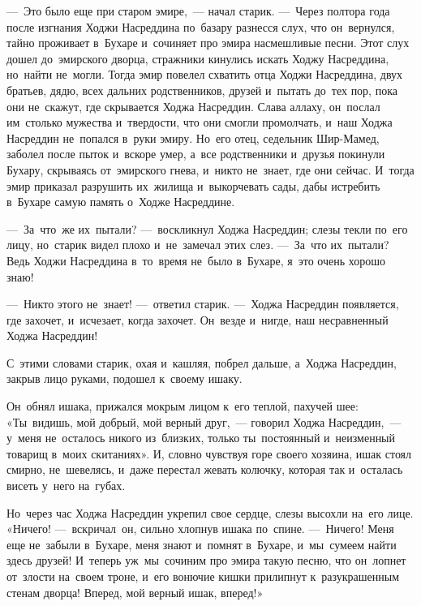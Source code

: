 \documentclass[12pt,a4paper]{book}
\begin{document}
—~Это было еще при старом эмире,~— начал старик. —~Через полтора года после изгнания Ходжи Насреддина по~базару разнесся слух, что он~вернулся, тайно проживает в~Бухаре и~сочиняет про эмира насмешливые песни. Этот слух дошел до~эмирского дворца, стражники кинулись искать Ходжу Насреддина, но~найти не~могли. Тогда эмир повелел схватить отца Ходжи Насреддина, двух братьев, дядю, всех дальних родственников, друзей и~пытать до~тех пор, пока они не~скажут, где скрывается Ходжа Насреддин. Слава аллаху, он~послал им~столько мужества и~твердости, что они смогли промолчать, и~наш Ходжа Насреддин не~попался в~руки эмиру. Но~его отец, седельник Шир-Мамед, заболел после пыток и~вскоре умер, а~все родственники и~друзья покинули Бухару, скрываясь от~эмирского гнева, и~никто не~знает, где они сейчас. И~тогда эмир приказал разрушить их~жилища и~выкорчевать сады, дабы истребить в~Бухаре самую память о~Ходже Насреддине.

—~За~что~же их~пытали? —~воскликнул Ходжа Насреддин; слезы текли по~его лицу, но~старик видел плохо и~не~замечал этих слез. —~За~что их~пытали? Ведь Ходжи Насреддина в~то~время не~было в~Бухаре, я~это очень хорошо знаю!

—~Никто этого не~знает! —~ответил старик. —~Ходжа Насреддин появляется, где захочет, и~исчезает, когда захочет. Он~везде и~нигде, наш несравненный Ходжа Насреддин!

С~этими словами старик, охая и~кашляя, побрел дальше, а~Ходжа Насреддин, закрыв лицо руками, подошел к~своему ишаку.

Он~обнял ишака, прижался мокрым лицом к~его теплой, пахучей шее: «Ты~видишь, мой добрый, мой верный друг,~— говорил Ходжа Насреддин,~— у~меня не~осталось никого из~близких, только ты~постоянный и~неизменный товарищ в~моих скитаниях». И, словно чувствуя горе своего хозяина, ишак стоял смирно, не~шевелясь, и~даже перестал жевать колючку, которая так и~осталась висеть у~него на~губах.

Но~через час Ходжа Насреддин укрепил свое сердце, слезы высохли на~его лице. «Ничего! —~вскричал~он, сильно хлопнув ишака по~спине. —~Ничего! Меня еще не~забыли в~Бухаре, меня знают и~помнят в~Бухаре, и~мы~сумеем найти здесь друзей! И~теперь уж~мы~сочиним про эмира такую песню, что он~лопнет от~злости на~своем троне, и~его вонючие кишки прилипнут к~разукрашенным стенам дворца! Вперед, мой верный ишак, вперед!»


\chapter{}
\end{document}
